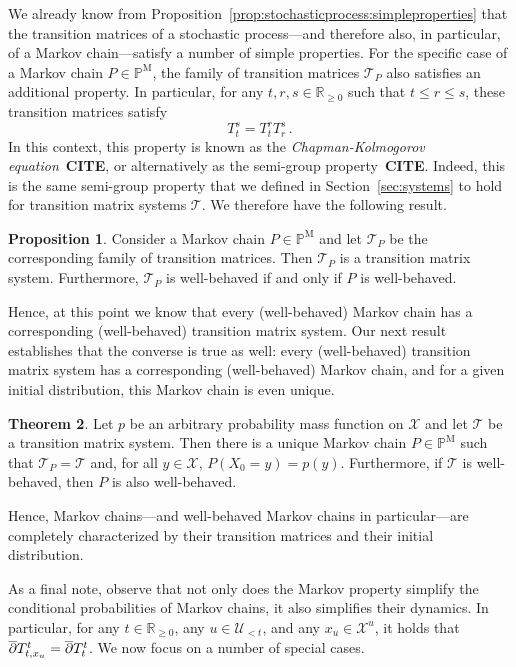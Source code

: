 \documentclass[10pt,a4paper]{paper}
\theoremstyle{definition}
\newtheorem{theorem}{Theorem}[section]
\newtheorem{proposition}[theorem]{Proposition}
\newcommand{\reals}{\mathbb{R}}
\newcommand{\realsnonneg}{\reals_{\geq 0}}
\newcommand{\states}{\mathcal{X}}
\newcommand{\processes}{\mathbb{P}}
\newcommand{\mprocesses}{\processes^{\mathrm{M}}}
\begin{document}
We already know from Proposition~\ref{prop:stochasticprocess:simpleproperties} that the transition matrices of a stochastic process---and therefore also, in particular, of a Markov chain---satisfy a number of simple properties. For the specific case of a Markov chain $P\in\mprocesses$, the family of transition matrices $\mathcal{T}_P$ also satisfies an additional property. In particular, for any $t,r,s\in\realsnonneg$ such that $t\leq r\leq s$, these transition matrices satisfy
\begin{equation}\label{eq:markovintermsofmatrices}
T_t^s = T_t^rT_r^s\,.
\end{equation}
In this context, this property is known as the \emph{Chapman-Kolmogorov equation}~{\bf CITE}, or alternatively as the semi-group property~{\bf CITE}. Indeed, this is the same semi-group property that we defined in Section~\ref{sec:systems} to hold for transition matrix systems $\mathcal{T}$. We therefore have the following result.

\begin{proposition}\label{prop:Markovhassystem}
Consider a Markov chain $P\in\mprocesses$ and let $\mathcal{T}_P$ be the corresponding family of transition matrices. Then $\mathcal{T}_P$ is a transition matrix system. Furthermore, $\mathcal{T}_P$ is well-behaved if and only if $P$ is well-behaved.
\end{proposition}

Hence, at this point we know that every (well-behaved) Markov chain has a corresponding (well-behaved) transition matrix system. Our next result establishes that the converse is true as well: every (well-behaved) transition matrix system has a corresponding (well-behaved) Markov chain, and for a given initial distribution, this Markov chain is even unique.

\begin{theorem}\label{theo:uniqueMarkovchain}
Let $p$ be an arbitrary probability mass function on $\states$ and let $\mathcal{T}$ be a transition matrix system. Then there is a unique Markov chain $P\in\mprocesses$ such that $\mathcal{T}_P=\mathcal{T}$ and, for all $y\in\states$, $P(X_0=y)=p(y)$. Furthermore, if $\mathcal{T}$ is well-behaved, then $P$ is also well-behaved.
\end{theorem}

Hence, Markov chains---and well-behaved Markov chains in particular---are completely characterized by their transition matrices and their initial distribution. 

As a final note, observe that not only does the Markov property simplify the conditional probabilities of Markov chains, it also simplifies their dynamics. In particular, for any $t\in\realsnonneg$, any $u\in\mathcal{U}_{<t}$, and any $x_u\in\states^u$, it holds that $\smash{\overline{\partial}}T_{t,x_u}^t=\smash{\overline{\partial}}T_{t}^t$. We now focus on a number of special cases.
\end{document}
